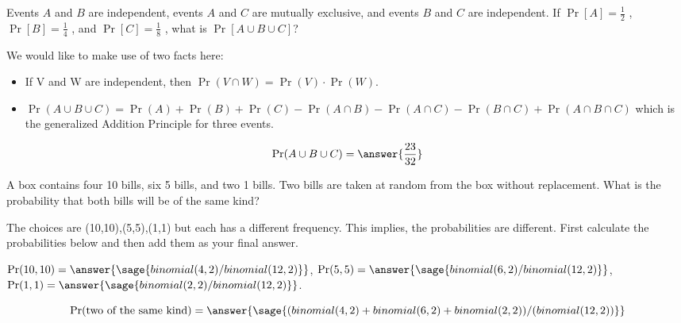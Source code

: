 \documentclass{ximera}
\begin{document}
\begin{problem}
Events $A$ and $B$ are independent, events $A$ and $C$ are mutually exclusive, and events $B$ and $C$ are independent. If $\Pr[A]= \frac{1}{2}$ , $\Pr[B]= \frac{1}{4}$ , and $\Pr[C]= \frac{1}{8}$ , what is $\Pr[A \cup B \cup C]$? 
\begin{hint}
We would like to make use of two facts here:
\begin{itemize}
    \item If V and W are independent, then $\Pr(V\cap W)=\Pr(V)\cdot \Pr(W) $.
    \item $\Pr(A\cup B\cup C)=\Pr(A)+\Pr(B)+\Pr(C)-\Pr(A\cap B)-\Pr(A\cap C)-\Pr(B\cap C) +\Pr(A\cap B \cap C)$ which is the generalized Addition Principle for three events.
\end{itemize}
\end{hint}

\begin{prompt}
\begin{equation*}
\Pr(A\cup B \cup C ) = \answer{\frac{23}{32}} 
\end{equation*}

\end{prompt}
\end{problem}


\begin{problem}
A box contains four 10 bills, six 5 bills, and two 1 bills. Two bills are taken at random from the box without replacement. What is the probability that both bills will be of the same kind? 
\begin{hint}
The choices are (10,10),(5,5),(1,1) but each has a different frequency. This implies, the probabilities are different. First calculate the probabilities below and then add them as your final answer.

$\Pr(10,10)=\answer{\sage{binomial(4,2)/binomial(12,2)}}$, $\Pr(5,5)=\answer{\sage{binomial(6,2)/binomial(12,2)}}$, 
$\Pr(1,1)=\answer{\sage{binomial(2,2)/binomial(12,2)}}$.
\end{hint}

\begin{prompt}
$$ 
\Pr(\text{two of the same kind}) =\answer{\sage{(binomial(4,2)+binomial(6,2)+binomial(2,2))/(binomial(12,2))}}
$$
\end{prompt}
\end{problem}
\end{document}
